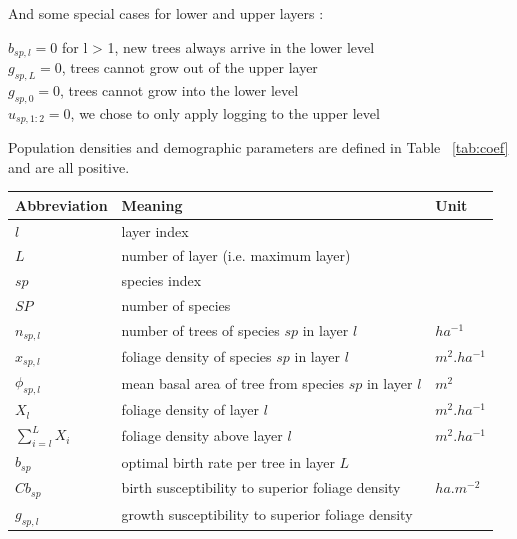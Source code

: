 \documentclass{article}
\begin{document}
And some special cases for lower and upper layers :

\begin{center}
    $b_{sp,l} = 0$ for l > 1, new trees always arrive in the lower level\\
    $g_{sp,L} = 0$, trees cannot grow out of the upper layer\\
    $g_{sp,0} = 0$, trees cannot grow into the lower level \\
    $u_{sp,1:2} = 0$, we chose to only apply logging to the upper level \\
\end{center}

Population densities and demographic parameters are defined in Table ~\ref{tab:coef} and are all positive.

\begin{table}[H]
    \centering
    \begin{tabular}{l l l}
    \hline
    \hline
    \textbf{Abbreviation} & \textbf{Meaning} & \textbf{Unit} \\
    \hline
    \hline
    $l$            & layer index                                                 &          \\
    $L$            & number of layer (i.e. maximum layer)                        &          \\
    $sp$           & species index                                               &          \\
    $SP$           & number of species                                           &            \\
    $n_{sp,l}$     & number of trees of species $sp$ in layer $l$                & $ha^{-1}$  \\    
    $x_{sp,l}$     & foliage density of species $sp$ in layer $l$                & $m^2.ha^{-1}$  \\
    $\phi_{sp,l}$     & mean basal area of tree from species $sp$ in layer $l$    & $m^2$  \\
    $X_{l}$        & foliage density of layer $l$                                & $m^2.ha^{-1}$  \\ 
    $\sum_{i = l}^{L} X_{i}$     & foliage density above layer $l$      & $m^2.ha^{-1}$  \\ 
    $b_{sp}$       & optimal birth rate per tree in layer $L$    &  \\
    $Cb_{sp}$      & birth susceptibility to superior foliage density    & $ha.m^{-2}$           \\
    $g_{sp,l}$     & growth susceptibility to superior foliage density           &  \\

\end{tabular}
\end{table}
\end{document}
